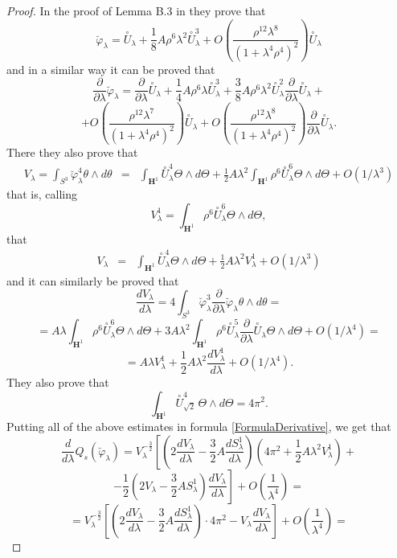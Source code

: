 \documentclass[a4paper,12pt]{amsart}
\renewcommand{\phi}{\varphi}
\newcommand{\de}{\partial}
\renewcommand{\H}{\mathbf{H}}
\renewcommand{\l}{\lambda }
\newcommand{\var}{\varphi }
\renewcommand{\th }{\theta }
\begin{document}
\begin{proof}
 In the proof of Lemma B.3 in \cite{CMY2} they prove that
$$\breve{\var}_\l = \overset{\circ}{U}_\l  + \frac 18 A \rho^6 \l^2 \overset{\circ}{U}_\l^3 
+ O \left( \frac{\rho^{12} \l^8}{(1 + \l^4 \rho^4)^2}  \right) \overset{\circ}{U}_\l$$
 and in a similar way it can be proved that
$$\frac{\de}{\de\lambda}\breve{\var}_\l = \frac{\de}{\de\lambda}\overset{\circ}{U}_\l  + \frac 14 A \rho^6 \l\overset{\circ}{U}_\l^3 + \frac{3}{8} A \rho^6 \l^2 \overset{\circ}{U}_\l^2\frac{\de}{\de\lambda}\overset{\circ}{U}_\l+$$
$$+ O \left( \frac{\rho^{12} \l^7}{(1 + \l^4 \rho^4)^2}  \right) \overset{\circ}{U}_\l + O \left( \frac{\rho^{12} \l^8}{(1 + \l^4 \rho^4)^2}  \right) \frac{\de}{\de\lambda}\overset{\circ}{U}_\l.$$
There they also prove that
\begin{eqnarray*}
  V_{\lambda} =\int_{S^3} \breve{\var}_\l^4 \th \wedge d \th  & = & \int_{\H^1} \overset{\circ}{U}_\l^4 \Theta\wedge d\Theta  + \frac{1}{2} A \l^2 \int_{\H^1} \rho^6 \overset{\circ}{U}_\l^6 \Theta\wedge d\Theta + O(1/\l^3)
\end{eqnarray*}
that is, calling
$$V_{\lambda}^1= \int_{\H^1} \rho^6 \overset{\circ}{U}_\l^6\Theta\wedge d\Theta ,$$
that
\begin{eqnarray*}
  V_{\lambda} & = & \int_{\H^1} \overset{\circ}{U}_\l^4 \Theta\wedge d\Theta  + \frac{1}{2} A \l^2 V_{\lambda}^1  + O(1/\l^3)
\end{eqnarray*}
and it can similarly be proved that
$$\frac{dV_{\lambda}}{d\lambda} = 4\int_{S^3} \breve{\var}_\l^3\frac{\de}{\de\lambda}\breve{\var}_\l \th \wedge d \th =$$
$$= A \l \int_{\H^1} \rho^6 \overset{\circ}{U}_\l^6 \Theta\wedge d\Theta + 
  3 A \l^2 \int_{\H^1} \rho^6 \overset{\circ}{U}_\l^5\frac{\de}{\de\lambda}\overset{\circ}{U}_\l \Theta\wedge d\Theta
  + O(1/\l^4)=$$
 $$= A\lambda V_{\lambda}^1 + \frac{1}{2}A\lambda^2\frac{dV_{\lambda}^1}{d\lambda} +O(1/\l^4).$$
They also prove that
$$\int_{\H^1} \overset{\circ}{U}_{\sqrt{2}}^4 \, \Theta\wedge d\Theta
= 4 \pi^2. $$
Putting all of the above estimates in formula \eqref{FormulaDerivative}, we get that
$$\frac{d}{d\lambda}Q_s(\breve\phi_\lambda)= V_{\lambda}^{-\frac{3}{2}}\left[\left( 2\frac{dV_{\lambda}}{d\lambda} - \frac{3}{2}A\frac{dS^1_{\lambda}}{d\lambda} \right)\left(4\pi^2 +\frac{1}{2} A \l^2 V_{\lambda}^1 \right) + \right.$$
$$\left.-\frac{1}{2}\left( 2V_{\lambda} -\frac{3}{2}AS^1_{\lambda}\right)\frac{dV_{\lambda}}{d\lambda}\right] +O\left(\frac{1}{\lambda^4}\right) =$$
$$= V_{\lambda}^{-\frac{3}{2}}\left[\left(2\frac{dV_{\lambda}}{d\lambda} - \frac{3}{2}A\frac{dS^1_{\lambda}}{d\lambda} \right) \cdot 4\pi^2-V_{\lambda}\frac{dV_{\lambda}}{d\lambda}\right] +O\left(\frac{1}{\lambda^4}\right) =$$

\end{proof}
\end{document}
